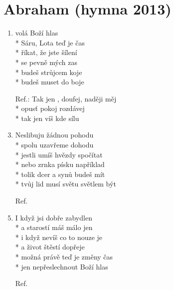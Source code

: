 \section{Abraham (hymna 2013)}
\begin{enumerate}
\item {} volá Boží hlas\\*
 Sáru, Lota teď je čas\\*
 říkat, že jste šílení\\*
 se pevně mých zas\\*
 budeš strůjcem koje\\*
 budeš muset do boje
\item[Ref.:] Tak jen , doufej, naději měj\\*
 opus\v{t} pokoj rozdávej\\*
tak jen  víš kde sílu 
\item Neslibuju žádnou pohodu\\*
spolu uzavřeme dohodu\\*
jestli umíš hvězdy spočítat\\*
nebo zrnka písku například\\*
tolik dcer a synů budeš mít\\*
tvůj lid musí světu světlem být
\item[Ref.]\,
\item I když jsi dobře zabydlen\\*
a starostí máš málo jen\\*
i když nevíš co to nouze je\\*
a život štěstí dopřeje\\*
možná právě te\v{d} je změny čas\\*
jen nepřeslechnout Boží hlas
\item[Ref.]\,
\end{enumerate}
